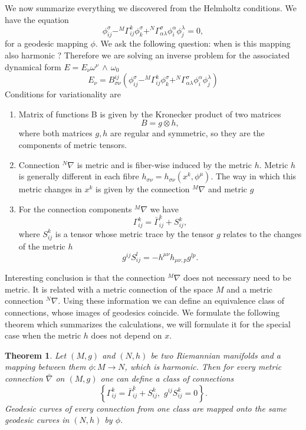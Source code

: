 \documentclass[english]{article}
\newtheorem{theorem}{Theorem}
\begin{document}
We now summarize everything we discovered from the Helmholtz conditions.
We have the equation
$$
\phi^{\sigma}_{ij}- ^M \Gamma^k_{ij}\phi^\sigma_k+^N\Gamma^\sigma_{\alpha\lambda}\phi^\alpha_i\phi^\lambda_j=0,
$$
for a geodesic mapping $\phi$. We ask the following question: when is this mapping also harmonic ? Therefore we are solving an inverse problem for the associated dynamical form $E=E_\nu \omega^\nu\,\wedge\,\omega_0$
$$
E_\nu=B^{ij}_{\sigma\nu}\left(\phi^{\sigma}_{ij}- ^M \Gamma^k_{ij}\phi^\sigma_k+^N\Gamma^\sigma_{\alpha\lambda}\phi^\alpha_i\phi^\lambda_j\right)
$$
Conditions for variationality are
\begin{enumerate}
\item Matrix of functions B is given by the Kronecker product of two matrices 
$$B=g\otimes h,$$
where both matrices $g,h$ are regular and symmetric, so they are the components of metric tensors.
\item Connection $^N\nabla$ is metric and is fiber-wise induced by the metric $h$. Metric $h$ is generally different in each fibre $h_{\sigma\nu}=h_{\sigma\nu}(x^k,\phi^\mu)$. The way in which this metric changes in $x^k$ is given by the connection $^M \nabla$ and metric $g$
\item For the connection components $^M \nabla$ we have
$$
\Gamma^k_{ij}=\bar{\Gamma}^k_{ij}+S^k_{ij},
$$
where $S^k_{ij}$ is a tensor whose metric trace by the tensor $g$ relates to the changes of the metric $h$  
$$
g^{ij}S^l_{ij}=-h^{\mu\nu}h_{\mu\nu,p}g^{lp}.
$$
\end{enumerate}
Interesting conclusion is that the connection $^M \nabla$ does not necessary need to be metric. It is related with a metric connection of the space $M$ and a metric connection $^N \nabla$. Using these information we can define an equivalence class of connections, whose images of geodesics coincide. We formulate the following theorem which summarizes the calculations, we will formulate it for the special case when the metric $h$ does not depend on $x$.
\begin{theorem}
Let $(M,g)$ and $(N,h)$ be two Riemannian manifolds and a mapping between them $\phi: M\rightarrow N$, which is harmonic. Then for every metric connection $\bar{\nabla}$ on $(M,g)$ one can define a class of connections  
$$
\left\{\Gamma^k_{ij}=\bar{\Gamma}^k_{ij}+S^k_{ij}, \,\, g^{ij}S^k_{ij}=0 \right\}.
$$
Geodesic curves of every connection from one class are mapped onto the same geodesic curves in $(N,h)$ by $\phi$.
\end{theorem}
\end{document}
